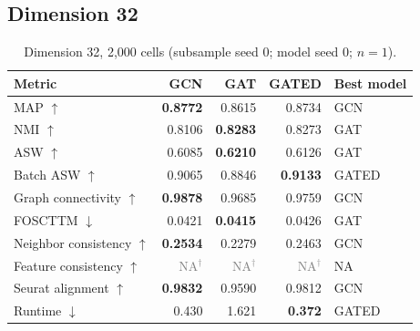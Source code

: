 \documentclass[10pt]{article}
\begin{document}
\subsection{Dimension 32}
\begin{table}[H]\centering\small
\caption{Dimension 32, 2,000 cells (subsample seed 0; model seed 0; $n=1$).}
\begin{tabular}{@{}lrrrl@{}}\toprule
Metric & GCN & GAT & GATED & Best model \\\midrule
MAP $\uparrow$ & \textbf{0.8772} & 0.8615 & 0.8734 & GCN \\
NMI $\uparrow$ & 0.8106 & \textbf{0.8283} & 0.8273 & GAT \\
ASW $\uparrow$ & 0.6085 & \textbf{0.6210} & 0.6126 & GAT \\
Batch ASW $\uparrow$ & 0.9065 & 0.8846 & \textbf{0.9133} & GATED \\
Graph connectivity $\uparrow$ & \textbf{0.9878} & 0.9685 & 0.9759 & GCN \\
FOSCTTM $\downarrow$ & 0.0421 & \textbf{0.0415} & 0.0426 & GAT \\
Neighbor consistency $\uparrow$ & \textbf{0.2534} & 0.2279 & 0.2463 & GCN \\
Feature consistency $\uparrow$ & \textcolor{gray}{NA$^{\dagger}$} & \textcolor{gray}{NA$^{\dagger}$} & \textcolor{gray}{NA$^{\dagger}$} & NA \\
Seurat alignment $\uparrow$ & \textbf{0.9832} & 0.9590 & 0.9812 & GCN \\
Runtime $\downarrow$ & 0.430 & 1.621 & \textbf{0.372} & GATED \\
\bottomrule\end{tabular}
\end{table}
\end{document}
